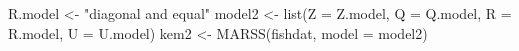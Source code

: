 \begin{Schunk}
\begin{Sinput}
 R.model <- "diagonal and equal"
 model2 <- list(Z = Z.model, Q = Q.model, R = R.model, U = U.model)
 kem2 <- MARSS(fishdat, model = model2)
\end{Sinput}
\end{Schunk}
